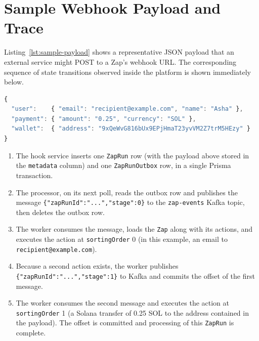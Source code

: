 \chapter{Sample Webhook Payload and Trace}
{

Listing~\ref{lst:sample-payload} shows a representative JSON payload that an external service might POST to a Zap's webhook URL. The corresponding sequence of state transitions observed inside the platform is shown immediately below.

\begin{lstlisting}[language=JavaScript, caption={Sample webhook payload.}, label=lst:sample-payload]
{
  "user":    { "email": "recipient@example.com", "name": "Asha" },
  "payment": { "amount": "0.25", "currency": "SOL" },
  "wallet":  { "address": "9xQeWvG816bUx9EPjHmaT23yvVM2Z7trM5HEzy" }
}
\end{lstlisting}

\begin{enumerate}[label=\arabic*., leftmargin=*, itemsep=2pt, parsep=2pt, topsep=2pt]
\item The hook service inserts one \texttt{ZapRun} row (with the payload above stored in the \texttt{metadata} column) and one \texttt{ZapRunOutbox} row, in a single Prisma transaction.
\item The processor, on its next poll, reads the outbox row and publishes the message \texttt{\{"zapRunId":"...","stage":0\}} to the \texttt{zap-events} Kafka topic, then deletes the outbox row.
\item The worker consumes the message, loads the \texttt{Zap} along with its actions, and executes the action at \texttt{sortingOrder} 0 (in this example, an email to \texttt{recipient@example.com}).
\item Because a second action exists, the worker publishes \texttt{\{"zapRunId":"...","stage":1\}} to Kafka and commits the offset of the first message.
\item The worker consumes the second message and executes the action at \texttt{sortingOrder} 1 (a Solana transfer of 0.25 SOL to the address contained in the payload). The offset is committed and processing of this \texttt{ZapRun} is complete.
\end{enumerate}
}%
